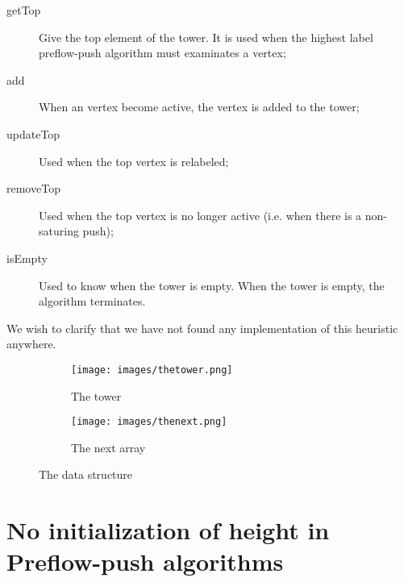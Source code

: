 \begin{description}
	\item[getTop] Give the top element of the tower. It is used when the highest label preflow-push algorithm must examinates a vertex;
	\item[add] When an vertex become active, the vertex is added to the tower;
	\item[updateTop] Used when the top vertex is relabeled;
	\item[removeTop] Used when the top vertex is no longer active (i.e. when there is a non-saturing push);
	\item[isEmpty] Used to know when the tower is empty. When the tower is empty, the algorithm terminates.
\end{description}

We wish to clarify that we have not found any implementation of this heuristic anywhere.

\begin{figure}
\centering
\begin{subfigure}{.5\textwidth}
  \centering
  \texttt{[image: images/thetower.png]}
  \caption{The tower}
  \label{fig:tower}
\end{subfigure}%
\begin{subfigure}{.5\textwidth}
  \centering
  \texttt{[image: images/thenext.png]}
  \caption{The next array}
  \label{fig:next}
\end{subfigure}
\caption{The data structure}
\label{fig:TheTower}
\end{figure}

\section{No initialization of height in Preflow-push algorithms}
\label{sec:hauteurs}

